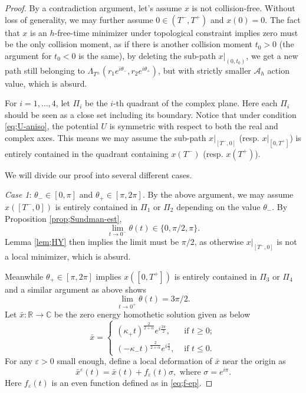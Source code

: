 \documentclass[11pt]{amsart}
\newcommand{\rr}{\mathbb R}
\newcommand{\cc}{\mathbb C}
\newcommand{\A}{\mathcal A}
\newcommand{\al}{\alpha}
\newcommand{\ep}{\varepsilon}
\newcommand{\tht}{\theta}
\newcommand{\sg}{\sigma}
\newcommand{\kp}{\kappa}
\newcommand{\Lmd}{\Lambda}
\theoremstyle{plain}
\theoremstyle{definition}
\theoremstyle{remark}
\begin{document}
\begin{proof}
By a contradiction argument, let's assume $x$ is not collision-free. Without loss of generality, we may further assume $0 \in (T^-, T^+)$ and $x(0)=0$. The fact that $x$ is an $h$-free-time minimizer under topological constraint implies zero must be the only collision moment, as if there is another collision moment $t_0>0$ (the argument for $t_0 <0$ is the same), by deleting the sub-path $x|_{(0, t_0)}$, we get a new path still belonging to $\Lmd_{T^{\pm}}(r_1 e^{i \tht_-}, r_2 e^{i \tht_+})$, but with strictly smaller $\A_h$ action value, which is absurd. 

For $i=1, \dots, 4$, let $\Pi_i$ be the $i$-th quadrant of the complex plane. Here each $\Pi_i$ should be seen as a close set including its boundary. Notice that under condition \eqref{eq;U-aniso}, the potential $U$ is symmetric with respect to both the real and complex axes. This means we may assume the sub-path $x|_{[T^-, 0]}$ (resp. $x|_{[0, T^+]}$) is entirely contained in the quadrant containing $x(T^-)$ (resp. $x(T^+)$). 



We will divide our proof into several different cases. 


\emph{Case 1}: $\tht_- \in [0, \pi]$ and $\tht_+ \in [\pi, 2\pi]$. 
By the above argument, we may assume $x([T^-, 0])$ is entirely contained in $\Pi_1$ or $\Pi_2$ depending on the value $\tht_-$. By Proposition \ref{prop;Sundman-est},
$$ \lim_{t \to 0^-} \tht(t) \in \{0, \pi/2, \pi \}.$$
Lemma \ref{lem;HY} then implies the limit must be $\pi/2$, as otherwise $x|_{[T^-, 0]}$ is not a local minimizer, which is absurd. 

Meanwhile $\tht_+ \in [\pi, 2\pi]$ implies $x([0, T^+])$ is entirely contained in $\Pi_3$ or $\Pi_4$ and a similar argument as above shows 
$$ \lim_{t \to 0^{+}} \tht(t) = 3\pi/2. $$ 
Let $\bar{x}: \rr \to \cc$ be the zero energy homothetic solution given as below 
$$ \bar{x} = \begin{cases}
(\kp_+ t)^{\frac{2}{2 +\al}} e^{i \frac{3\pi}{2}}, & \text{ if } t \ge 0; \\
(-\kp_- t)^{\frac{2}{2 +\al}} e^{i \frac{\pi}{2}}, & \text{ if } t \le 0.
\end{cases}
$$
For any $\ep>0$ small enough, define a local deformation of $\bar{x}$ near the origin as 
\begin{equation}
\label{eq;x-bar-ep} \bar{x}^{\ep}(t) = \bar{x}(t) + f_{\ep}(t) \sg, \text{ where } \sg = e^{i \pi}.
\end{equation}
Here $f_{\ep}(t)$ is an even function defined as in \eqref{eq;f-ep}.  


\end{proof}
\end{document}
